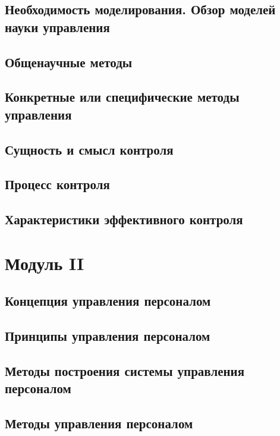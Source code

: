 \documentclass[a4paper,12pt,oneside,final]{extarticle}
\numberwithin{equation}{section}
\begin{document}
\subsection{Необходимость моделирования. Обзор моделей науки управления}

\subsection{Общенаучные методы}

\subsection{Конкретные или специфические методы управления}

\subsection{Сущность и смысл контроля}

\subsection{Процесс контроля}

\subsection{Характеристики эффективного контроля}

%
%
\section{Модуль II}
\subsection{Концепция управления персоналом}

\subsection{Принципы управления персоналом}

\subsection{Методы построения системы управления персоналом}

\subsection{Методы управления персоналом}
\end{document}
